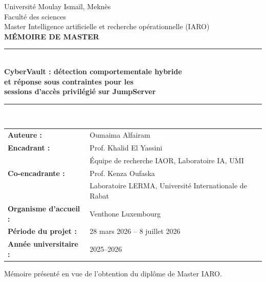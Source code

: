 \documentclass[11pt,a4paper,oneside]{report}
\theoremstyle{definition}
\theoremstyle{plain}
\begin{document}

\begin{titlepage}
\centering
{\large Université Moulay Ismaïl, Meknès}\\[0.2cm]
{\large Faculté des sciences}\\[0.2cm]
{\large Master Intelligence artificielle et recherche opérationnelle (IARO)}\\[1.5cm]

{\Large\bfseries MÉMOIRE DE MASTER}\\[1.0cm]
\rule{\textwidth}{0.8pt}\\[0.65cm]
{\LARGE\bfseries CyberVault : détection comportementale hybride\\[0.22cm]
et réponse sous contraintes pour les\\[0.22cm]
sessions d'accès privilégié sur JumpServer}\\[0.65cm]
\rule{\textwidth}{0.8pt}\\[1.25cm]

\begin{minipage}{0.88\textwidth}
\begin{tabular}{@{}ll@{}}
\textbf{Auteure :} & Oumaima Alfairam \\[0.25cm]
\textbf{Encadrant :} & Prof. Khalid El Yassini \\
& Équipe de recherche IAOR, Laboratoire IA, UMI \\[0.25cm]
\textbf{Co-encadrante :} & Prof. Kenza Oufaska \\
& Laboratoire LERMA, Université Internationale de Rabat \\[0.25cm]
\textbf{Organisme d'accueil :} & Venthone Luxembourg \\[0.25cm]
\textbf{Période du projet :} & 28 mars 2026 -- 8 juillet 2026 \\
\textbf{Année universitaire :} & 2025--2026
\end{tabular}
\end{minipage}

\vfill
{\small Mémoire présenté en vue de l'obtention du diplôme de Master IARO.}
\end{titlepage}

\end{document}
